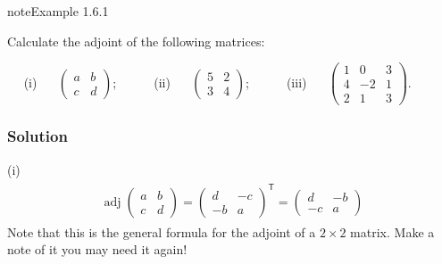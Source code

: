 \documentclass[letterpaper,10pt,english]{jupyterBook}
\begin{document}
\begin{sphinxadmonition}{note}{Example 1.6.1}



\sphinxAtStartPar
Calculate the adjoint of the following matrices:

\sphinxAtStartPar
  (i)   \(\begin{pmatrix} a & b \\ c & d \end{pmatrix}\);  
  (ii)   \(\begin{pmatrix} 5 & 2 \\ 3 & 4 \end{pmatrix}\);  
  (iii)   \(\begin{pmatrix} 1 & 0 & 3 \\ 4 & -2 & 1 \\ 2 & 1 & 3 \end{pmatrix}\).
\subsubsection*{Solution}

\sphinxAtStartPar
(i)
\begin{equation*}
\begin{split} \begin{align*}
    \operatorname{adj}\begin{pmatrix} a & b \\ c & d \end{pmatrix} = \begin{pmatrix} d & -c \\ -b & a \end{pmatrix}^\mathsf{T}
= \begin{pmatrix} d & -b \\ -c & a \end{pmatrix}
\end{align*} \end{split}
\end{equation*}
\sphinxAtStartPar
Note that this is the general formula for the adjoint of a \(2 \times 2\) matrix. Make a note of it \sphinxhyphen{} you may need it again!


\end{sphinxadmonition}
\end{document}

